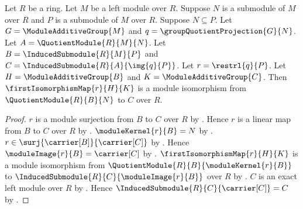 \begin{theorem}\label{module_quotient_correspondence_induced_isomorphism}
    Let $R$ be a ring.
    Let $M$ be a left module over $R$.
    Suppose $N$ is a submodule of $M$ over $R$ and
        $P$ is a submodule of $M$ over $R$.
    Suppose $N\subseteq P$.
    Let $G=\ModuleAdditiveGroup{M}$ and
        $q=\groupQuotientProjection{G}{N}$.
    Let $A=\QuotientModule{R}{M}{N}$.
    Let $B=\InducedSubmodule{R}{M}{P}$ and
        $C=\InducedSubmodule{R}{A}{\img{q}{P}}$.
    Let $r=\restrl{q}{P}$.
    Let $H=\ModuleAdditiveGroup{B}$ and
        $K=\ModuleAdditiveGroup{C}$.
    Then $\firstIsomorphismMap{r}{H}{K}$ is a module isomorphism from
        $\QuotientModule{R}{B}{N}$ to $C$ over $R$.
\end{theorem}
\begin{proof}
    $r$ is a module surjection from $B$ to $C$ over $R$ by
        .
    Hence $r$ is a linear map from $B$ to $C$ over $R$ by
        .
    $\moduleKernel{r}{B}=N$ by
        .
    $r\in\surj{\carrier[B]}{\carrier[C]}$ by
        .
    Hence $\moduleImage{r}{B}=\carrier[C]$ by
        .
    $\firstIsomorphismMap{r}{H}{K}$ is a module isomorphism from
        $\QuotientModule{R}{B}{\moduleKernel{r}{B}}$ to
        $\InducedSubmodule{R}{C}{\moduleImage{r}{B}}$
        over $R$ by .
    $C$ is an exact left module over $R$ by
        .
    Hence $\InducedSubmodule{R}{C}{\carrier[C]}=C$ by
        .
\end{proof}


